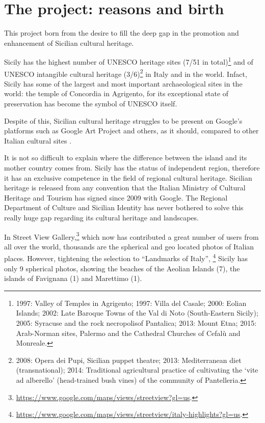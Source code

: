 \documentclass[amsthm,ebook]{saparticle}
\begin{document}
\section{The project: reasons and birth}


\noindent This project born from the desire to fill the deep gap in the promotion and enhancement of Sicilian cultural heritage. 

Sicily has the highest number of UNESCO heritage sites (7/51 in total)\footnote{1997: Valley of Temples in Agrigento;
1997: Villa del Casale; 2000: Eolian Islands; 2002: Late Baroque Towns of the Val di Noto (South-Eastern Sicily); 2005:
Syracuse and the rock necropolisof Pantalica; 2013: Mount Etna; 2015: Arab-Norman sites, Palermo and the Cathedral
Churches of Cefalù and Monreale.} and of UNESCO intangible cultural heritage (3/6)\footnote{2008: Opera dei Pupi,
Sicilian puppet theatre; 2013: Mediterranean diet (transnational); 2014: Traditional agricultural practice of
cultivating the `vite ad alberello' (head-trained bush vines) of the community of Pantelleria.} in Italy and in the
world. Infact, Sicily has some of the largest and most important archaeological sites in the world: the temple of
Concordia in Agrigento, for its exceptional state of preservation has become the symbol of UNESCO itself.

Despite of this, Sicilian cultural heritage struggles to be present on Google’s platforms such as Google Art Project and
others, as it should, compared to other Italian cultural sites \citep{Bonacini2013, Bonacini2014}.

It is not so difficult to explain where the difference between the island and its mother country comes from. Sicily has
the status of independent region, therefore it has an exclusive competence in the field of regional cultural heritage.
Sicilian heritage is released from any convention that the Italian Ministry of Cultural Heritage and Tourism has signed
since 2009 with Google. The Regional Department of Culture and Sicilian Identity has never bothered to solve this
really huge gap regarding its cultural heritage and landscapes.

In Street View Gallery,\footnote{\url{https://www.google.com/maps/views/streetview?gl=us}.} which now has contributed a great
number of users from all over the world, thousands are the spherical and geo located photos of Italian places. However,
tightening the selection to ``Landmarks of Italy'',
\footnote{\url{https://www.google.com/maps/views/streetview/italy-highlights?gl=us}.} Sicily has only 9 spherical photos,
showing the beaches of the Aeolian Islands (7), the islands of Favignana (1) and Marettimo (1). 
\end{document}
